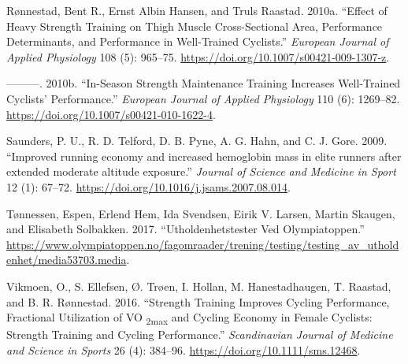 \documentclass[
]{book}
\newlength{\cslhangindent}
\newlength{\cslentryspacingunit} %
\newenvironment{CSLReferences}[2] %
 {%
  \setlength{\parindent}{0pt}
  \ifodd #1
  \let\oldpar\par
  \def\par{\hangindent=\cslhangindent\oldpar}
  \fi
  \setlength{\parskip}{#2\cslentryspacingunit}
 }%
 {}
\begin{document}
\begin{CSLReferences}{1}{0}
\leavevmode{}%
Rønnestad, Bent R., Ernst Albin Hansen, and Truls Raastad. 2010a.
{``Effect of Heavy Strength Training on Thigh Muscle Cross-Sectional
Area, Performance Determinants, and Performance in Well-Trained
Cyclists.''} \emph{European Journal of Applied Physiology} 108 (5):
965--75. \url{https://doi.org/10.1007/s00421-009-1307-z}.

\leavevmode{}%
---------. 2010b. {``In-Season Strength Maintenance Training Increases
Well-Trained Cyclists{'} Performance.''} \emph{European Journal of
Applied Physiology} 110 (6): 1269--82.
\url{https://doi.org/10.1007/s00421-010-1622-4}.

\leavevmode{}%
Saunders, P. U., R. D. Telford, D. B. Pyne, A. G. Hahn, and C. J. Gore.
2009. {``Improved running economy and increased hemoglobin mass in elite
runners after extended moderate altitude exposure.''} \emph{Journal of
Science and Medicine in Sport} 12 (1): 67--72.
\url{https://doi.org/10.1016/j.jsams.2007.08.014}.

\leavevmode{}%
Tønnessen, Espen, Erlend Hem, Ida Svendsen, Eirik V. Larsen, Martin
Skaugen, and Elisabeth Solbakken. 2017. {``Utholdenhetstester Ved
Olympiatoppen.''}
\url{https://www.olympiatoppen.no/fagomraader/trening/testing/testing_av_utholdenhet/media53703.media}.

\leavevmode{}%
Vikmoen, O., S. Ellefsen, Ø. Trøen, I. Hollan, M. Hanestadhaugen, T.
Raastad, and B. R. Rønnestad. 2016. {``Strength Training Improves
Cycling Performance, Fractional Utilization of VO {\textsubscript{2max}}
and Cycling Economy in Female Cyclists: Strength Training and Cycling
Performance.''} \emph{Scandinavian Journal of Medicine and Science in
Sports} 26 (4): 384--96. \url{https://doi.org/10.1111/sms.12468}.

\end{CSLReferences}

\backmatter
\end{document}
